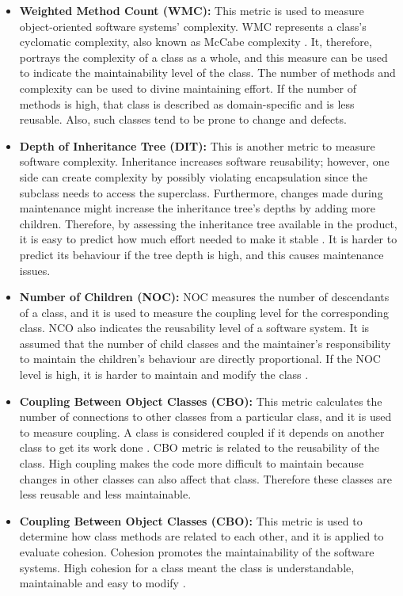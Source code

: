 \begin{itemize}
    \item \textbf{Weighted Method Count (WMC):} This metric is used to measure object-oriented software systems’ complexity. WMC represents a class's cyclomatic complexity, also known as McCabe complexity \cite{35}. It, therefore, portrays the complexity of a class as a whole, and this measure can be used to indicate the maintainability level of the class. The number of methods and complexity can be used to divine maintaining effort. If the number of methods is high, that class is described as domain-specific and is less reusable. Also, such classes tend to be prone to change and defects.
    \item \textbf{Depth of Inheritance Tree (DIT):} This is another metric to measure software complexity. Inheritance increases software reusability; however, one side can create complexity by possibly violating encapsulation since the subclass needs to access the superclass. Furthermore, changes made during maintenance might increase the inheritance tree's depths by adding more children. Therefore, by assessing the inheritance tree available in the product, it is easy to predict how much effort needed to make it stable \cite{33}. It is harder to predict its behaviour if the tree depth is high, and this causes maintenance issues.
    \item \textbf{Number of Children (NOC):} NOC measures the number of descendants of a class, and it is used to measure the coupling level for the corresponding class. NCO also indicates the reusability level of a software system. It is assumed that the number of child classes and the maintainer's responsibility to maintain the children's behaviour are directly proportional. If the NOC level is high, it is harder to maintain and modify the class \cite{36}.
    \item \textbf{Coupling Between Object Classes (CBO):} This metric calculates the number of connections to other classes from a particular class, and it is used to measure coupling. A class is considered coupled if it depends on another class to get its work done \cite{34}. CBO metric is related to the reusability of the class. High coupling makes the code more difficult to maintain because changes in other classes can also affect that class. Therefore these classes are less reusable and less maintainable.
    \item \textbf{Coupling Between Object Classes (CBO):} This metric is used to determine how class methods are related to each other, and it is applied to evaluate cohesion. Cohesion promotes the maintainability of the software systems. High cohesion for a class meant the class is understandable, maintainable and easy to modify \cite{33}.
\end{itemize}

